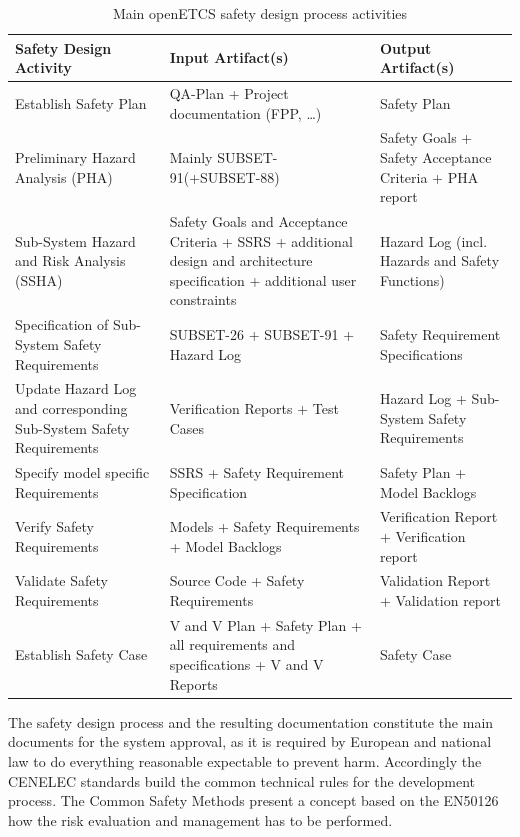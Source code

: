 \documentclass{template/openetcs_report}
\begin{document}
\begin{table}[htbp]
  \centering
  \caption{Main openETCS safety design process activities}
    \begin{tabular}{p{4cm}|p{6cm}|p{4cm}} 
 \textbf{Safety Design Activity} & \textbf{Input Artifact(s)} & \textbf{Output Artifact(s)}  \\ \hline
 Establish Safety Plan & QA-Plan + Project documentation (FPP, …) & Safety Plan \\
 Preliminary Hazard Analysis (PHA) & Mainly SUBSET-91(+SUBSET-88) &  Safety Goals + Safety Acceptance Criteria +  PHA report\\ 
 Sub-System Hazard and Risk Analysis (SSHA) & Safety Goals and Acceptance Criteria + SSRS + additional design and architecture specification + additional user constraints  & Hazard Log (incl. Hazards and Safety Functions) \\ 
  Specification of Sub-System Safety Requirements & SUBSET-26 + SUBSET-91 + Hazard Log  & Safety Requirement Specifications \\ 
 Update Hazard Log and corresponding Sub-System Safety Requirements & Verification Reports + Test Cases & Hazard Log + Sub-System Safety Requirements \\
 Specify model specific Requirements & SSRS + Safety Requirement Specification & Safety Plan + Model Backlogs\\
 Verify Safety Requirements & Models + Safety Requirements + Model Backlogs & Verification Report + Verification report \\
 Validate Safety Requirements & Source Code + Safety Requirements & Validation Report + Validation report \\
 Establish Safety Case & V and V Plan + Safety Plan + all requirements and specifications + V and V Reports & Safety Case \\ 
 
\end{tabular}  
  \label{tab:openETCS-Safety-activities}%
\end{table}%

The safety design process and the resulting documentation constitute the main documents for the system approval, as it is required by European and national law to do everything reasonable expectable to prevent harm. Accordingly the CENELEC standards build the common technical rules for the development process. The Common Safety Methods present a concept based on the EN50126 how the risk evaluation and management has to be performed. 
\end{document}

